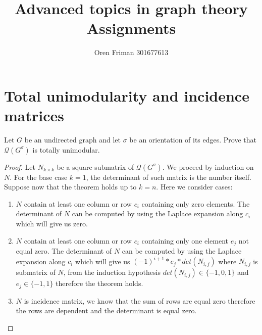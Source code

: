 \documentclass[a4paper, 11pt, oneside]{article}
\newenvironment{problem}[1]
  {\renewcommand\theinnercustomprob{#1}\innercustomprob}
  {\endinnercustomprob}
\begin{document}
\title{Advanced topics in graph theory Assignments}
\author{Oren Friman 301677613}
\maketitle

\section{Total unimodularity and incidence matrices}

\begin{problem}{1.1}\label{problem1.1}
Let $G$ be an undirected graph and let $\sigma$ be an orientation of its edges. Prove that
$\mathcal{Q}(G^\sigma)$ is totally unimodular.
\end{problem}

\begin{proof}
Let $N_{k\times k}$ be a square submatrix of $\mathcal{Q}(G^\sigma)$. We proceed by induction on $N$. For the base case $k = 1$, the determinant of such matrix is the number itself. Suppose now that the theorem holds up to $k=n$. Here we consider cases:
\begin{enumerate}[label=(\alph*)]
\item $N$ contain at least one column or row $c_i$ containing only zero elements. The determinant of $N$ can be computed by using the Laplace expansion along $c_i$ which will give us zero.
\item $N$ contain at least one column or row $c_i$ containing only one element $e_j$ not equal zero. The determinant of $N$ can be computed by using the Laplace expansion along $c_i$ which will give us $(-1)^{i+ 1} * e_j * det(N_{i,j})$ where $N_{i,j}$ is submatrix of $N$, from the induction hypothesis $det(N_{i,j}) \in\{-1, 0, 1\}$ and $e_j \in\{-1, 1\}$ therefore the theorem holds.
\item $N$ is incidence matrix, we know that the sum of rows are equal zero therefore the rows are dependent and the determinant is equal zero.
\end{enumerate}
\end{proof}
\end{document}
